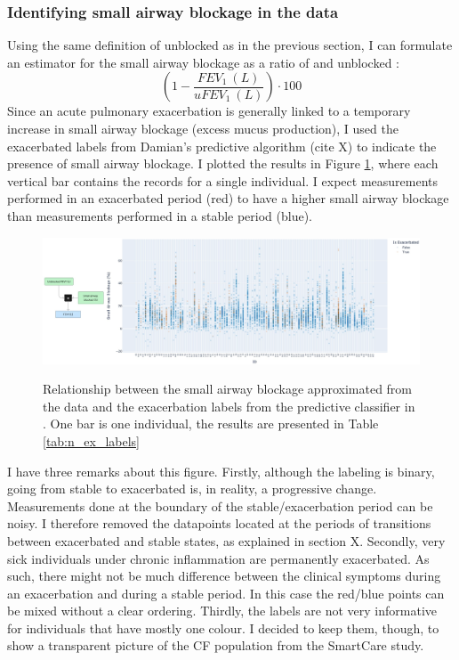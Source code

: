 \subsubsection{Identifying small airway blockage in the data}
Using the same definition of unblocked \F as in the previous section, I can formulate an estimator for the small airway blockage as a ratio of \F and unblocked \F:
\begin{equation}
    (1 - \frac{F\!EV_1\ (L)}{uF\!EV_1\ (L)})\cdot 100
\end{equation}
Since an acute pulmonary exacerbation is generally linked to a temporary increase in small airway blockage (excess mucus production), I used the exacerbated labels from Damian's predictive algorithm (cite X) to indicate the presence of small airway blockage. I plotted the results in Figure \ref{fig:factor_fev1_small_airway_blockage}, where each vertical bar contains the \F records for a single individual. I expect measurements performed in an exacerbated period (red) to have a higher small airway blockage than measurements performed in a stable period (blue). 
\begin{figure}[!h]
    \caption{Relationship between the small airway blockage approximated from the data and the exacerbation labels from the predictive classifier in \cite{damian}.  One bar is one individual, the results are presented in Table \ref{tab:n_ex_labels}}
    \centering
    \includegraphics[width=150mm]{Chapter1/Figs/factor_unblocked_fev1_small_airway_blockage.png}
    \label{fig:factor_fev1_small_airway_blockage}
\end{figure}
I have three remarks about this figure. Firstly, although the labeling is binary, going from stable to exacerbated is, in reality, a progressive change. Measurements done at the boundary of the stable/exacerbation period can be noisy. I therefore removed the datapoints located at the periods of transitions between exacerbated and stable states, as explained in section X. Secondly, very sick individuals under chronic inflammation are permanently exacerbated. As such, there might not be much difference between the clinical symptoms during an exacerbation and during a stable period. In this case the red/blue points can be mixed without a clear ordering. Thirdly, the labels are not very informative for individuals that have mostly one colour. I decided to keep them, though, to show a transparent picture of the CF population from the SmartCare study.

